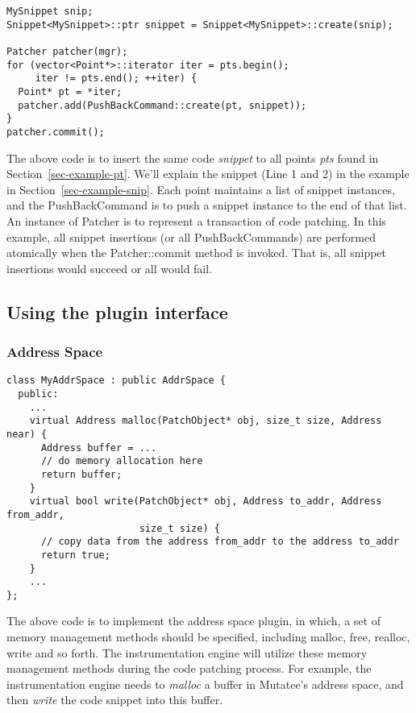 \lstset{numbers=left}
\begin{lstlisting}
MySnippet snip;
Snippet<MySnippet>::ptr snippet = Snippet<MySnippet>::create(snip);

Patcher patcher(mgr);
for (vector<Point*>::iterator iter = pts.begin();
     iter != pts.end(); ++iter) {
  Point* pt = *iter;
  patcher.add(PushBackCommand::create(pt, snippet));
}
patcher.commit();
\end{lstlisting}

The above code is to insert the same code \emph{snippet} to all points
\emph{pts} found in Section~\ref{sec-example-pt}. We'll explain the snippet
(Line 1 and 2) in the example in Section~\ref{sec-example-snip}. Each point
maintains a list of snippet instances, and the PushBackCommand is to push a
snippet instance to the end of that list. An instance of Patcher is to represent
a transaction of code patching. In this example, all snippet insertions (or all
PushBackCommands) are performed atomically when the Patcher::commit method is
invoked. That is, all snippet insertions would succeed or all would fail.

\subsection{Using the plugin interface}

\subsubsection{Address Space}
\lstset{numbers=left}
\begin{lstlisting}
class MyAddrSpace : public AddrSpace {
  public:
    ...
    virtual Address malloc(PatchObject* obj, size_t size, Address near) {
      Address buffer = ...
      // do memory allocation here
      return buffer;
    }
    virtual bool write(PatchObject* obj, Address to_addr, Address from_addr,
                       size_t size) {
      // copy data from the address from_addr to the address to_addr
      return true;
    }
    ...
};
\end{lstlisting}
The above code is to implement the address space plugin, in which, a set of
memory management methods should be specified, including malloc, free, realloc,
write and so forth. The instrumentation engine will utilize these memory
management methods during the code patching process. For example, the
instrumentation engine needs to \emph{malloc} a buffer in Mutatee's address
space, and then \emph{write} the code snippet into this buffer.

